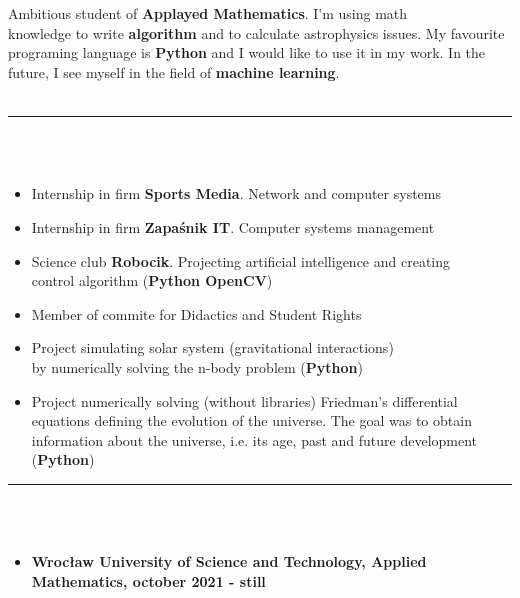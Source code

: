 \documentclass[10pt]{article}
\begin{document}
    \begin{minipage}[t]{0.60\textwidth}
        \fontsize{10pt}{10pt} \\ \\
        Ambitious student of \textbf{Applayed Mathematics}. I'm using math \\ knowledge to write \textbf{algorithm} and to calculate astrophysics issues.
        My favourite programing language is \textbf{Python} and I would like to use it in my work. In the future, I see myself in the field of \textbf{machine learning}. \\ \\
        \rule{11cm}{1pt} \\ \\
        \fontsize{10pt}{10pt}
        \begin{itemize}[leftmargin=*]
            \setlength{\parskip}{0pt}
            \item Internship in firm \textbf{Sports Media}. Network and computer systems 
            \item Internship in firm \textbf{Zapaśnik IT}. Computer systems management
            \item Science club \textbf{Robocik}. Projecting artificial intelligence and creating \\ control algorithm  (\textbf{Python OpenCV})
            \item Member of commite for Didactics and Student Rights
            \item Project simulating solar system (gravitational interactions) \\ by numerically solving the n-body problem  (\textbf{Python})
            \item Project numerically solving (without libraries) Friedman's differential equations defining the evolution of the universe.
            The goal was to obtain information about the universe, i.e. its age, past and future development (\textbf{Python})
        \end{itemize}
        \rule{11cm}{1pt} \\ \\
        \fontsize{10pt}{10pt}
        \begin{itemize}[leftmargin=*]
            \setlength{\parskip}{0pt}
            \item \textbf{Wrocław University of Science and Technology, Applied Mathematics, october 2021 - still}

\end{itemize}
\end{minipage}
\end{document}
